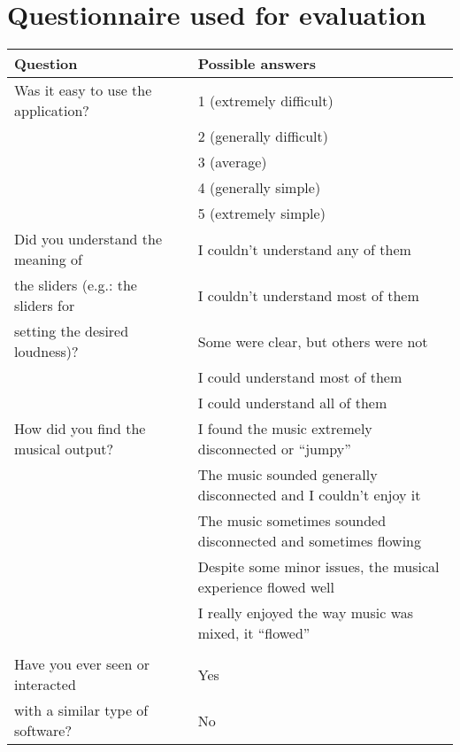 \chapter{Questionnaire used for evaluation} 

\label{AppendixD} 


\begin{center}
\begin{longtable}{ p{} p{} p{} } 
\hline
\textbf{Question} & & \textbf{Possible answers} \\ \toprule
Was it easy to use the application? & & 1 (extremely difficult) \\ \cmidrule(r){3-3}
& & 2 (generally difficult) \\ \cmidrule(r){3-3}
& & 3 (average) \\ \cmidrule(r){3-3}
& & 4 (generally simple) \\ \cmidrule(r){3-3}
& & 5 (extremely simple) \\ \midrule
Did you understand the meaning of & & I couldn’t understand any of them \\ \cmidrule(r){3-3}
the sliders (e.g.: the sliders for & & I couldn’t understand most of them \\ \cmidrule(r){3-3}
setting the desired loudness)? & & Some were clear, but others were not \\ \cmidrule(r){3-3}
& & I could understand most of them \\ \cmidrule(r){3-3}
& & I could understand all of them \\ \midrule
How did you find the musical output? & & I found the music extremely disconnected or “jumpy” \\ \cmidrule(r){3-3}
& & The music sounded generally disconnected and I couldn’t enjoy it \\ \cmidrule(r){3-3}
& & The music sometimes sounded disconnected and sometimes flowing \\ \cmidrule(r){3-3}
& & Despite some minor issues, the musical experience flowed well \\ \cmidrule(r){3-3}
& & I really enjoyed the way music was mixed, it “flowed” \\ \midrule \\ \midrule
Have you ever seen or interacted & & Yes \\ \cmidrule(r){3-3}
with a similar type of software? & & No \\ \midrule

\end{longtable}
\end{center}
